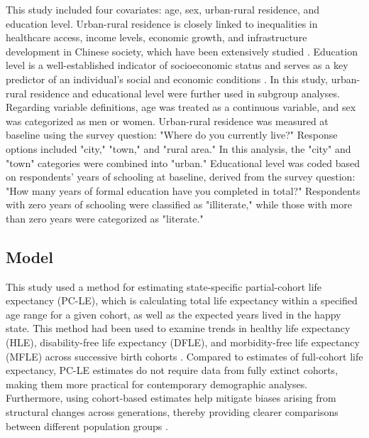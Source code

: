 \documentclass[12pt, a4paper]{article}
\begin{document}
This study included four covariates: age, sex, urban-rural residence, and education level. Urban-rural residence is closely linked to inequalities in healthcare access, income levels, economic growth, and infrastructure development in Chinese society, which have been extensively studied \autocite{liu.2019.are}. Education level is a well-established indicator of socioeconomic status and serves as a key predictor of an individual's social and economic conditions \autocite{wan.2024.socioeconomic}. In this study, urban-rural residence and educational level were further used in subgroup analyses. Regarding variable definitions, age was treated as a continuous variable, and sex was categorized as men or women. Urban-rural residence was measured at baseline using the survey question: "Where do you currently live?" Response options included "city," "town," and "rural area." In this analysis, the "city" and "town" categories were combined into "urban." Educational level was coded based on respondents' years of schooling at baseline, derived from the survey question: "How many years of formal education have you completed in total?" Respondents with zero years of schooling were classified as "illiterate," while those with more than zero years were categorized as "literate."

\subsection{Model}
This study used a method for estimating state-specific partial-cohort life expectancy (PC-LE), which is calculating total life expectancy within a specified age range for a given cohort, as well as the expected years lived in the happy state. This method had been used to examine trends in healthy life expectancy (HLE), disability-free life expectancy (DFLE), and morbidity-free life expectancy (MFLE) across successive birth cohorts \autocite{liu.2019.are,payne.2022.expansion,payne.2019.expansion,shen.2023.disability}. Compared to estimates of full-cohort life expectancy, PC-LE estimates do not require data from fully extinct cohorts, making them more practical for contemporary demographic analyses. Furthermore, using cohort-based estimates help mitigate biases arising from structural changes across generations, thereby providing clearer comparisons between different population groups \autocite{payne.2022.expansion}.
\end{document}
